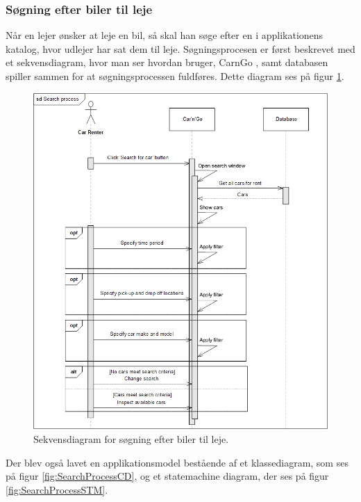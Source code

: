 \documentclass[Arkitektur/System_main.tex]{subfiles}
\begin{document}
\subsubsection{Søgning efter biler til leje}
Når en lejer ønsker at leje en bil, så skal han søge efter en i applikationens katalog, hvor udlejer har sat dem til leje. Søgningsprocesen er først beskrevet med et sekvensdiagram, hvor man ser hvordan bruger, CarnGo , samt databasen spiller sammen for at søgningsprocessen fuldføres. Dette diagram ses på figur \ref{fig:SearchProcessSD}. 
\begin{figure}[H]
    \centering
    \includegraphics[width=1\textwidth]{Arkitektur/Softwarearkitektur/Searching/graphics/Search_Process_SD.png}
    \caption{Sekvensdiagram for søgning efter biler til leje. }
    \label{fig:SearchProcessSD}
\end{figure}
Der blev også lavet en applikationsmodel bestående af et klassediagram, som ses på figur \ref{fig:SearchProcessCD}, og et statemachine diagram, der ses på figur \ref{fig:SearchProcessSTM}.
\end{document}

